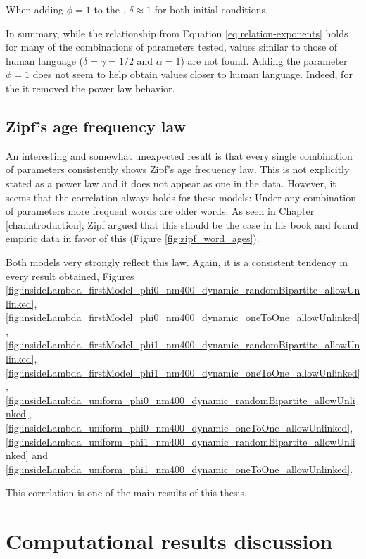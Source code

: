 When adding $\phi=1$ to the \secondmodel{}, $\delta \approx 1$ for both initial conditions.

In summary, while the relationship from Equation \eqref{eq:relation-exponents} holds for many of the combinations of parameters tested, values similar to those of human language ($\delta=\gamma=1/2$ and $\alpha=1$) are not found.
Adding the parameter $\phi=1$ does not seem to help obtain values closer to human language.
Indeed, for the \firstmodel{} it removed the power law behavior.

\subsection{Zipf's age frequency law}
\label{sec:discussion_math_age-freq}

An interesting and somewhat unexpected result is that every single combination of parameters consistently shows Zipf's age frequency law.
This is not explicitly stated as a power law and it does not appear as one in the data.
However, it seems that the correlation always holds for these models: Under any combination of parameters more frequent words are older words.
As seen in Chapter \ref{cha:introduction}, Zipf argued that this should be the case in his book \cite{Zipf1949a} and found empiric data in favor of this (Figure \ref{fig:zipf_word_ages}).

Both models very strongly reflect this law.
Again, it is a consistent tendency in every result obtained, Figures \ref{fig:insideLambda_firstModel_phi0_nm400_dynamic_randomBipartite_allowUnlinked},  \ref{fig:insideLambda_firstModel_phi0_nm400_dynamic_oneToOne_allowUnlinked},  \ref{fig:insideLambda_firstModel_phi1_nm400_dynamic_randomBipartite_allowUnlinked},  \ref{fig:insideLambda_firstModel_phi1_nm400_dynamic_oneToOne_allowUnlinked},  \ref{fig:insideLambda_uniform_phi0_nm400_dynamic_randomBipartite_allowUnlinked},  \ref{fig:insideLambda_uniform_phi0_nm400_dynamic_oneToOne_allowUnlinked},  \ref{fig:insideLambda_uniform_phi1_nm400_dynamic_randomBipartite_allowUnlinked} and \ref{fig:insideLambda_uniform_phi1_nm400_dynamic_oneToOne_allowUnlinked}.

This correlation is one of the main results of this thesis.

\section{Computational results discussion}
\label{sec:discussion_comp}

